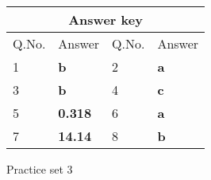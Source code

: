\setlength\arrayrulewidth{1pt}
\begin{table}[H]
	\centering
	
	\begin{tabular}{|p{1.5cm}|p{1.5cm}||p{1.5cm}|p{1.5cm}|}
		\hline
		\multicolumn{4}{|c|}{\textbf{Answer key}}\\\hline\hline
		\rowcolor{ocrel}Q.No.&Answer&Q.No.&Answer\\\hline
		1&\textbf{b}&2&\textbf{a}\\\hline
		3&\textbf{b}&4&\textbf{c}\\\hline
		5&\textbf{0.318}&6&\textbf{a}\\\hline
		7&\textbf{14.14}&8&\textbf{b}\\\hline
	\end{tabular}
\end{table}
\newpage
\begin{abox}
	Practice set 3 
	\end{abox}
